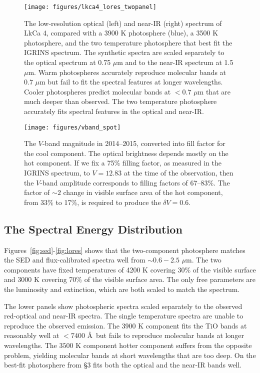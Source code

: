 \documentclass[twocolumn]{emulateapj}%
\begin{document}
\begin{figure*}
	\centering
	\texttt{[image: figures/lkca4\_lores\_twopanel]}
	\caption{The low-resolution optical (left) and near-IR (right) spectrum of LkCa 4, compared with a 3900 K photosphere (blue), a 3500 K photosphere, and the two temperature photosphere that best fit the IGRINS spectrum.  The synthetic spectra are scaled separately to the optical spectrum at 0.75 $\mu$m and to the near-IR spectrum at 1.5 $\mu$m.  Warm photospheres accurately reproduce molecular bands at $0.7$ $\mu$m but fail to fit the spectral features at longer wavelengths.  Cooler photospheres predict molecular bands at $<0.7$ $\mu$m that are much deeper than observed.  The two temperature photosphere accurately fits spectral features in the optical and near-IR.}
	\label{fig:lores_twopanel}
\end{figure*}


\begin{figure*}
	\centering
	\texttt{[image: figures/vband\_spot]}
\caption{The $V$-band magnitude in 2014--2015, converted into fill factor for the cool component.  The optical brightness depends mostly on the hot component.  If we fix a 75\% filling factor, as measured in the IGRINS spectrum, to $V=12.83$ at the time of the observation, then the $V$-band amplitude  corresponds to filling factors of 67--83\%.  The factor of $\sim 2$ change in visible surface area of the hot component, from 33\% to 17\%, is required to produce the $\delta V=0.6$.  }
\label{fig:vband_spot}
\end{figure*}



\subsection{The Spectral Energy Distribution}\label{sec:SED}

Figures~\ref{fig:sed}-\ref{fig:lores} shows that the two-component photosphere matches the SED and flux-calibrated spectra well from $\sim 0.6-2.5$ $\mu$m.  The two components have fixed temperatures of 4200 K covering 30\% of the visible surface and 3000 K covering 70\% of the visible surface area.  The only free parameters are the luminosity and extinction, which are both scaled to match the spectrum.

The lower panels show photospheric spectra scaled separately to the observed red-optical and near-IR spectra.  The single temperature spectra are unable to reproduce the observed emission.  The $3900$ K component fits the TiO bands at reasonably well at $<7400$ \AA\ but fails to reproduce molecular bands at longer wavelengths.  The $3500$ K component hotter component suffers from the opposite problem, yielding molecular bands at short wavelengths that are too deep.  On the best-fit photosphere from \S 3 fits both the optical and the near-IR bands well.
\end{document}
